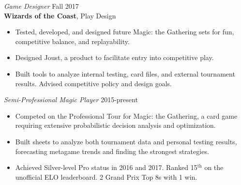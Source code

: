 \documentclass[margin, 10pt]{res} %
\begin{document}
\begin{resume}
{\sl Game Designer} \hfill Fall 2017 \\
\textbf{Wizards of the Coast}, Play Design
\begin{itemize} \itemsep -2pt %
	\item Tested, developed, and designed future Magic: the Gathering sets for fun, competitive balance, and replayability. 
	\item Designed Joust, a product to facilitate entry into competitive play. 
	\item Built tools to analyze internal testing, card files, and external tournament results. Advised competitive policy and design goals. 
\end{itemize}


{\sl Semi-Professional Magic Player} \hfill 2015-present 
\begin{itemize} \itemsep -2pt %
	\item Competed on the Professional Tour for Magic: the Gathering, a card game requiring extensive probabilistic decision analysis and optimization. 
	\item Built sheets to analyze both tournament data and personal testing results, forecasting metagame trends and finding the strongest strategies. 
	\item Achieved Silver-level Pro status in 2016 and 2017. Ranked 15$^{\text{th}}$ on the unofficial ELO leaderboard. 2 Grand Prix Top 8s with 1 win. 
\end{itemize}

%


\end{resume}
\end{document}
